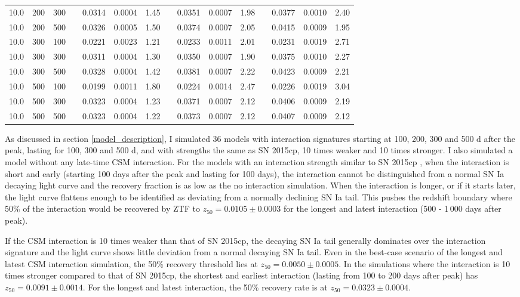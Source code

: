 \documentclass[a4paper,oneside,12pt, class=Latex/Classes/PhDthesisPSnPDF, crop=false]{standalone}
\begin{document}
\begin{table}
{\begin{tabular}{cccclcrclcrclcr}
  10.0 & 200 & 300 && 0.0314 & 0.0004 & 1.45 && 0.0351 & 0.0007 & 1.98 && 0.0377 & 0.0010 & 2.40\\
  10.0 & 200 & 500 && 0.0326 & 0.0005 & 1.50 && 0.0374 & 0.0007 & 2.05 && 0.0415 & 0.0009 & 1.95\\
  10.0 & 300 & 100 && 0.0221 & 0.0023 & 1.21 && 0.0233 & 0.0011 & 2.01 && 0.0231 & 0.0019 & 2.71\\
  10.0 & 300 & 300 && 0.0311 & 0.0004 & 1.30 && 0.0350 & 0.0007 & 1.90 && 0.0375 & 0.0010 & 2.27\\
  10.0 & 300 & 500 && 0.0328 & 0.0004 & 1.42 && 0.0381 & 0.0007 & 2.22 && 0.0423 & 0.0009 & 2.21\\
  10.0 & 500 & 100 && 0.0199 & 0.0011 & 1.80 && 0.0224 & 0.0014 & 2.47 && 0.0226 & 0.0019 & 3.04\\
  10.0 & 500 & 300 && 0.0323 & 0.0004 & 1.23 && 0.0371 & 0.0007 & 2.12 && 0.0406 & 0.0009 & 2.19\\
  10.0 & 500 & 500 && 0.0323 & 0.0004 & 1.22 && 0.0373 & 0.0007 & 2.12 && 0.0407 & 0.0009 & 2.12\\
  \hline
 \end{tabular}
 }
 \label{sim_z50_results}
\end{table}

As discussed in section \ref{model_description}, I simulated 36 models with interaction signatures starting at 100, 200, 300 and 500 d after the peak, lasting for 100, 300 and 500 d, and with strengths the same as SN 2015cp, 10 times weaker and 10 times stronger. I also simulated a model without any late-time CSM interaction. For the models with an interaction strength similar to SN 2015cp \citep{2015cp}, when the interaction is short and early (starting 100 days after the peak and lasting for 100 days), the interaction cannot be distinguished from a normal SN Ia decaying light curve and the recovery fraction is as low as the no interaction simulation. When the interaction is longer, or if it starts later, the light curve flattens enough to be identified as deviating from a normally declining SN Ia tail. This pushes the redshift boundary where 50\% of the interaction would be recovered by ZTF to $z_{50} = 0.0105 \pm 0.0003$ for the longest and latest interaction (500 - 1\,000 days after peak).

If the CSM interaction is 10 times weaker than that of SN 2015cp, the decaying SN Ia tail generally dominates over the interaction signature and the light curve shows little deviation from a normal decaying SN Ia tail. Even in the best-case scenario of the longest and latest CSM interaction simulation, the 50\% recovery threshold lies at $z_{50} = 0.0050 \pm 0.0005$. In the simulations where the interaction is 10 times stronger compared to that of SN 2015cp, the shortest and earliest interaction (lasting from 100 to 200 days after peak) has $z_{50} = 0.0091 \pm 0.0014$. For the longest and latest interaction, the 50\% recovery rate is at $z_{50} = 0.0323 \pm 0.0004$.
\end{document}

